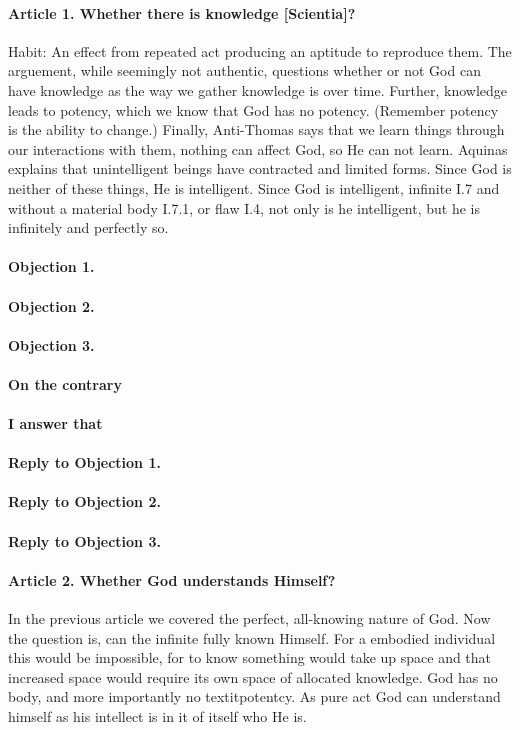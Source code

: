 \documentclass{ucetd}
\begin{document}
\paragraph{Article 1. Whether there is knowledge [Scientia]?}
\gls{Habit: An effect from repeated act producing an aptitude to reproduce them.}
The arguement, while seemingly not authentic, questions whether or not God can have knowledge as the way we gather knowledge is over time. Further, knowledge leads to potency, which we know that God has no potency. (Remember potency is the ability to change.) Finally, Anti-Thomas says that we learn things through our interactions with them, nothing can affect God, so He can not learn.
Aquinas explains that unintelligent beings have contracted and limited forms. Since God is neither of these things, He is intelligent. Since God is intelligent, infinite I.7 and without a material body I.7.1, or flaw I.4, not only is he intelligent, but he is infinitely and perfectly so.
\paragraph{Objection 1.}
\paragraph{Objection 2.}
\paragraph{Objection 3.}
\paragraph{On the contrary}
\paragraph{I answer that}
\paragraph{Reply to Objection 1.}
\paragraph{Reply to Objection 2.}
\paragraph{Reply to Objection 3.}

\paragraph{Article 2. Whether God understands Himself?}
In the previous article we covered the perfect, all-knowing nature of God. Now the question is, can the infinite fully known Himself. For a embodied individual this would be impossible, for to know something would take up space and that increased space would require its own space of allocated knowledge. God has no body, and more importantly no textit{potentcy}. As pure act God can understand himself as his intellect is in it of itself who He is.
\end{document}
